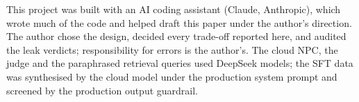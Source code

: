 This project was built with an AI coding assistant (Claude, Anthropic), which
wrote much of the code and helped draft this paper under the author's
direction. The author chose the design, decided every trade-off reported here,
and audited the leak verdicts; responsibility for errors is the author's. The
cloud NPC, the judge and the paraphrased retrieval queries used DeepSeek
models; the SFT data was synthesised by the cloud model under the production
system prompt and screened by the production output guardrail.
